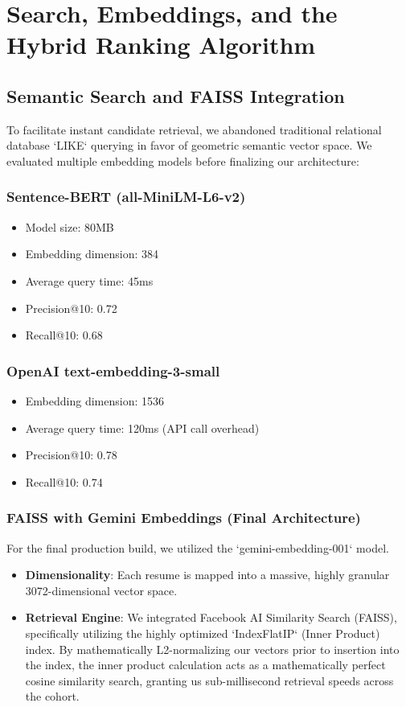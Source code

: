\documentclass[12pt,a4paper]{report}
\begin{document}
\section{Search, Embeddings, and the Hybrid Ranking Algorithm}

\subsection{Semantic Search and FAISS Integration}

To facilitate instant candidate retrieval, we abandoned traditional relational database `LIKE` querying in favor of geometric semantic vector space. We evaluated multiple embedding models before finalizing our architecture:

\subsubsection{Sentence-BERT (all-MiniLM-L6-v2)}
\begin{itemize}
    \item Model size: 80MB
    \item Embedding dimension: 384
    \item Average query time: 45ms
    \item Precision@10: 0.72
    \item Recall@10: 0.68
\end{itemize}

\subsubsection{OpenAI text-embedding-3-small}
\begin{itemize}
    \item Embedding dimension: 1536
    \item Average query time: 120ms (API call overhead)
    \item Precision@10: 0.78
    \item Recall@10: 0.74
\end{itemize}

\subsubsection{FAISS with Gemini Embeddings (Final Architecture)}
For the final production build, we utilized the `gemini-embedding-001` model. 
\begin{itemize}
    \item \textbf{Dimensionality}: Each resume is mapped into a massive, highly granular 3072-dimensional vector space.
    \item \textbf{Retrieval Engine}: We integrated Facebook AI Similarity Search (FAISS), specifically utilizing the highly optimized `IndexFlatIP` (Inner Product) index. By mathematically L2-normalizing our vectors prior to insertion into the index, the inner product calculation acts as a mathematically perfect cosine similarity search, granting us sub-millisecond retrieval speeds across the cohort.
\end{itemize}
\end{document}
